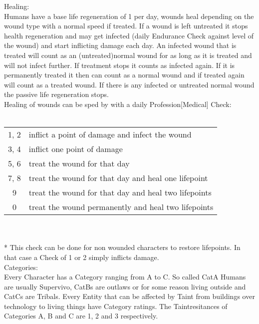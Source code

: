 \documentclass{article}
\begin{document}
Healing:\\
Humans have a base life regeneration of 1 per day, wounds heal depending on the wound type with a normal speed if treated.
If a wound is left untreated it stops health regeneration and may get infected (daily Endurance Check against level of
the wound) and start inflicting damage each day. An infected wound that is treated will count as an (untreated)normal
wound for as long as it is treated and will not infect further. If treatment stops it counts as infected again. If it is
permanently treated it then can count as a normal wound and if treated again will count as a treated wound. If there is
any infected or untreated normal wound the passive life regeneration stops. \\
Healing of wounds can be sped by with a daily Profession[Medical] Check:\\\\
\begin{tabular}{cl}
1, 2 & inflict a point of damage and infect the wound\\
3, 4 & inflict one point of damage\\
5, 6 & treat the wound for that day\\
7, 8 & treat the wound for that day and heal one lifepoint\\
9 & treat the wound for that day and heal two lifepoints\\
0 & treat the wound permanently and heal two lifepoints\\
\end{tabular}\\\\*
This check can be done for non wounded characters to restore lifepoints. In that case a Check of 1 or 2 simply inflicts damage.\\



Categories:\\
Every Character has a Category ranging from A to C. So called CatA Humans are usually Supervivo, CatBs are outlaws or
for some reason living outside and CatCs are Tribals.
Every Entity that can be affected by Taint from buildings over technology to living things have Category ratings.
The Taintresitances of Categories A, B and C are 1, 2 and 3 respectively.\\
\end{document}
